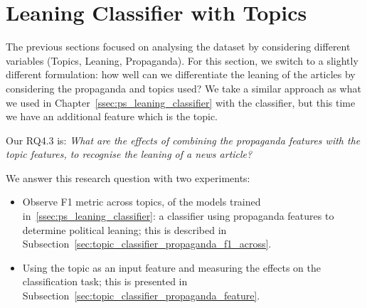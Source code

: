 







\section{\statusgreen Leaning Classifier with Topics}
\label{sec:topic_classifier_propaganda}

The previous sections focused on analysing the dataset by considering different variables (Topics, Leaning, Propaganda).
For this section, we switch to a slightly different formulation: how well can we differentiate the leaning of the articles by considering the propaganda and topics used?
We take a similar approach as what we used in Chapter~\ref{ssec:ps_leaning_classifier} with the classifier, but this time we have an additional feature which is the topic.

Our RQ4.3 is: \emph{What are the effects of combining the propaganda features with the topic
features, to recognise the leaning of a news article?}

We answer this research question with two experiments:

\begin{itemize}
    \item Observe F1 metric across topics, of the models trained in~\ref{ssec:ps_leaning_classifier}: a classifier using propaganda features to determine political leaning; this is described in Subsection~\ref{sec:topic_classifier_propaganda_f1_across}.
    \item Using the topic as an input feature and measuring the effects on the classification task; this is presented in Subsection~\ref{sec:topic_classifier_propaganda_feature}.
\end{itemize}



